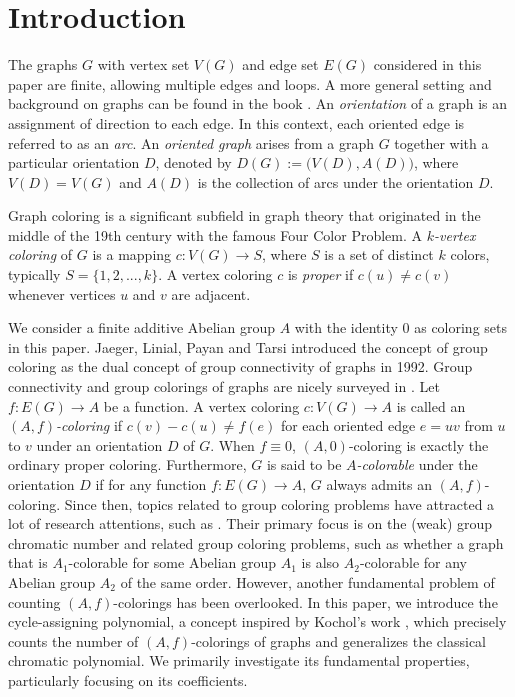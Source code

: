 \documentclass[12pt]{article}%
\numberwithin{equation}{section}
\begin{document}
\section{Introduction}\label{Sec1}
The graphs $G$ with vertex set $V(G)$ and edge set $E(G)$ considered in this paper are finite, allowing multiple edges and loops. A more general setting and background on graphs can be found in the book \cite{Bondy2008}. An {\em orientation} of a graph is an assignment of direction to each edge. In this context, each oriented edge is referred to as an {\em arc}. An {\em oriented graph} arises from a graph $G$ together with a particular orientation $D$, denoted by  $D(G):=\big(V(D),A(D)\big)$, where $V(D)=V(G)$ and $A(D)$ is the collection of arcs under the orientation $D$.  

Graph coloring is a significant subfield in graph theory that originated in the middle of the 19th century with the famous Four Color Problem. A {\em$k$-vertex coloring} of $G$ is a mapping $c:V(G)\to S$, where $S$ is a set of distinct $k$ colors, typically $S=\{1, 2, . . . , k\}$. A vertex coloring $c$ is {\em proper} if  $c(u)\ne c(v)$ whenever vertices $u$ and $v$ are adjacent.

We consider a finite additive Abelian group $A$ with the identity $0$ as coloring sets in this paper. Jaeger, Linial, Payan and Tarsi \cite{Jaeger1992} introduced  the concept of  group coloring as the dual concept of group connectivity of graphs in 1992. Group connectivity and group colorings of graphs are nicely surveyed in \cite{Lai-Shao2011}. Let $ f: E(G)\to A$ be a function. A vertex coloring $c:V(G)\to A$ is called an {\em$(A, f)$-coloring} if $c(v)-c(u)\ne f(e)$ for each oriented edge $e=uv$ from $u$ to $v$ under an orientation $D$ of $G$. When $f\equiv0$, $(A,0)$-coloring is exactly the ordinary proper coloring. Furthermore, $G$ is said to be {\em$A$-colorable} under the orientation $D$ if for any function $ f:E(G)\to A$, $G$ always admits an $(A, f)$-coloring. Since then, topics related to group coloring problems have attracted a lot of research attentions, such as \cite{Kral2005,Langhede-Thomassen2020,Langhede-Thomassen2024,Li-Lai2013,Lai-Li2006,Lai-Mazza2021,Lai-Mazza2021-1,Lai-Zhang2002}.   Their primary focus is on the (weak) group chromatic number and related group coloring problems, such as whether a graph that is $A_1$-colorable for some Abelian group $A_1$ is also $A_2$-colorable for any Abelian group $A_2$ of the same order. However, another fundamental problem of counting $(A, f)$-colorings has been overlooked. In this paper, we introduce the cycle-assigning polynomial, a concept inspired by Kochol's work \cite{Kochol2022,Kochol2024}, which precisely counts the number of $(A, f)$-colorings of graphs and generalizes the classical chromatic polynomial. We primarily investigate its fundamental properties, particularly focusing on its coefficients.
\end{document}
